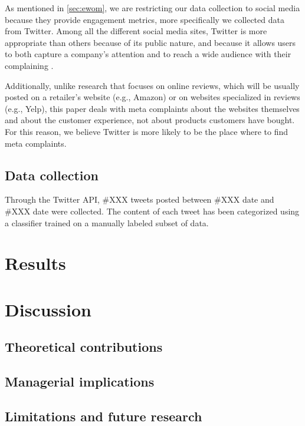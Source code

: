 \documentclass[12pt, a4paper]{article}
\begin{document}
As mentioned in \autoref{sec:ewom}, we are restricting our data collection to social
media because they provide engagement metrics, more specifically we collected data from
Twitter. Among all the different social media sites, Twitter is more appropriate than
others because of its public nature, and because it allows users to both capture a
company's attention and to reach a wide audience with their complaining
\cite{lopez2021}.

Additionally, unlike research that focuses on online reviews, which will be usually
posted on a retailer's website (e.g., Amazon) or on websites specialized in reviews
(e.g., Yelp), this paper deals with meta complaints about the websites themselves and
about the customer experience, not about products customers have bought. For this
reason, we believe Twitter is more likely to be the place where to find meta
complaints.

\subsection{Data collection}

Through the Twitter API, \#XXX tweets posted between \#XXX date and \#XXX date were
collected. The content of each tweet has been categorized using a classifier trained on
a manually labeled subset of data.

\section{Results}

\section{Discussion}
\subsection{Theoretical contributions}
\subsection{Managerial implications}
\subsection{Limitations and future research}

\newpage


\end{document}
